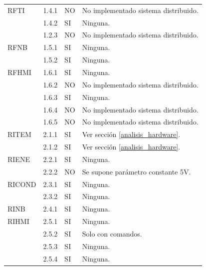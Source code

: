 \begin{table}[h!]
\begin{flushleft}
\begin{tabular}{|m{2.6cm}|m{1.5cm}|m{1.5cm}|m{6.8cm}|}
\multicolumn{1}{|l|}{RFTI} & { 1.4.1 } & { NO } & { No implementado sistema distribuido. }\\ \cline{ 2- 4} 
\multicolumn{1}{|l|}{} & { 1.4.2 } & { SI } & { Ninguna. }\\ \cline{ 2- 4} 
\multicolumn{1}{|l|}{} & { 1.2.3 } & { NO } & { No implementado sistema distribuido. }\\ \hline
\multicolumn{1}{|l|}{RFNB} & { 1.5.1 } & { SI } & { Ninguna. }\\ \cline{ 2- 4} 
\multicolumn{1}{|l|}{} & { 1.5.2 } & { SI } & { Ninguna. }\\ \hline
\multicolumn{1}{|l|}{RFHMI} & { 1.6.1 } & { SI } & { Ninguna. }\\ \cline{ 2- 4} 
\multicolumn{1}{|l|}{} & { 1.6.2 } & { NO } & { No implementado sistema distribuido. }\\ \cline{ 2- 4} 
\multicolumn{1}{|l|}{} & { 1.6.3 } & { SI } & { Ninguna. }\\ \cline{ 2- 4} 
\multicolumn{1}{|l|}{} & { 1.6.4 } & { NO } & { No implementado sistema distribuido. }\\ \cline{ 2- 4} 
\multicolumn{1}{|l|}{} & { 1.6.5 } & { NO } & { No implementado sistema distribuido. }\\ \hline 
\multicolumn{1}{|l|}{RITEM} & { 2.1.1 } & { SI } & { Ver sección \ref{analisis_hardware}. }\\ \cline{ 2- 4} 
\multicolumn{1}{|l|}{} & { 2.1.2 } & { SI } & { Ver sección \ref{analisis_hardware}. }\\ \hline 
\multicolumn{1}{|l|}{RIENE} & { 2.2.1 } & { SI } & { Ninguna. }\\ \cline{ 2- 4} 
\multicolumn{1}{|l|}{} & { 2.2.2 } & { NO } & { Se supone parámetro constante 5V. }\\ \hline
\multicolumn{1}{|l|}{RICOND} & { 2.3.1 } & { SI } & { Ninguna. }\\ \cline{ 2- 4} 
\multicolumn{1}{|l|}{} & { 2.3.2 } & { SI } & { Ninguna. }\\ \hline
\multicolumn{1}{|l|}{RINB} & { 2.4.1 } & { SI } & { Ninguna. }\\ \hline
\multicolumn{1}{|l|}{RIHMI} & { 2.5.1 } & { SI } & { Ninguna. }\\ \cline{ 2- 4} 
\multicolumn{1}{|l|}{} & { 2.5.2 } & { SI } & { Solo con comandos. }\\ \cline{ 2- 4} 
\multicolumn{1}{|l|}{} & { 2.5.3 } & { SI } & { Ninguna. }\\ \cline{ 2- 4} 
\multicolumn{1}{|l|}{} & { 2.5.4 } & { SI } & { Ninguna. }\\ \cline{ 2- 4} 

\end{tabular}
\end{flushleft}
\end{table}
